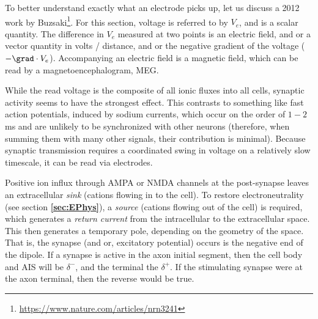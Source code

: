 To better understand exactly what an electrode picks up, let us discuss a 2012 work by Buzsaki\footnote{\url{https://www.nature.com/articles/nrn3241}}. For this section, voltage is referred to by $V_e$, and is a scalar quantity. The difference in $V_e$ measured at two points is an electric field, and or a vector quantity in volts / distance, and or the negative gradient of the voltage ($-\grad \cdot V_e$). Accompanying an electric field is a magnetic field, which can be read by a magnetoencephalogram, MEG.  \newline

While the read voltage is the composite of all ionic fluxes into all cells, synaptic activity seems to have the strongest effect. This contrasts to something like fast action potentials, induced by sodium currents, which occur on the order of $1-2$ms and are unlikely to be synchronized with other neurons (therefore, when summing them with many other signals, their contribution is minimal). Because synaptic transmission requires a coordinated swing in voltage on a relatively slow timescale, it can be read via electrodes.\newline
    
Positive ion influx through AMPA or NMDA channels at the post-synapse leaves an extracellular \textit{sink} (cations flowing in to the cell). To restore electroneutrality (see section \textbf{\ref{sec:EPhys}}), a \textit{source} (cations flowing out of the cell) is required, which generates a \textit{return current} from the intracellular to the extracellular space. This then generates a temporary pole, depending on the geometry of the space. That is, the synapse (and or, excitatory potential) occurs is the negative end of the dipole. If a synapse is active in the axon initial segment, then the cell body and AIS will be $\delta^-$, and the terminal the $\delta^+$. If the stimulating synapse were at the axon terminal, then the reverse would be true.\newline

